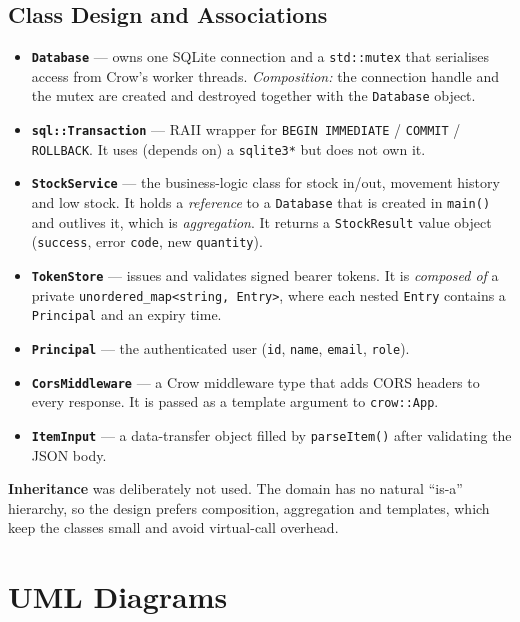 \documentclass[12pt,a4paper,oneside]{book}
\begin{document}
\subsection{Class Design and Associations}
\label{sec:assoc}
\begin{itemize}
  \item \textbf{\texttt{Database}} --- owns one SQLite connection and a \texttt{std::mutex} that
    serialises access from Crow's worker threads. \emph{Composition:} the connection handle and
    the mutex are created and destroyed together with the \texttt{Database} object.
  \item \textbf{\texttt{sql::Transaction}} --- RAII wrapper for \texttt{BEGIN IMMEDIATE} /
    \texttt{COMMIT} / \texttt{ROLLBACK}. It uses (depends on) a \texttt{sqlite3*} but does not own it.
  \item \textbf{\texttt{StockService}} --- the business-logic class for stock in/out, movement
    history and low stock. It holds a \emph{reference} to a \texttt{Database} that is created in
    \texttt{main()} and outlives it, which is \emph{aggregation}. It returns a
    \texttt{StockResult} value object (\texttt{success}, error \texttt{code}, new \texttt{quantity}).
  \item \textbf{\texttt{TokenStore}} --- issues and validates signed bearer tokens. It is
    \emph{composed of} a private \texttt{unordered\_map<string, Entry>}, where each nested
    \texttt{Entry} contains a \texttt{Principal} and an expiry time.
  \item \textbf{\texttt{Principal}} --- the authenticated user (\texttt{id}, \texttt{name},
    \texttt{email}, \texttt{role}).
  \item \textbf{\texttt{CorsMiddleware}} --- a Crow middleware type that adds CORS headers to
    every response. It is passed as a template argument to \texttt{crow::App}.
  \item \textbf{\texttt{ItemInput}} --- a data-transfer object filled by \texttt{parseItem()} after
    validating the JSON body.
\end{itemize}

\noindent\textbf{Inheritance} was deliberately not used. The domain has no natural
``is-a'' hierarchy, so the design prefers composition, aggregation and templates, which keep
the classes small and avoid virtual-call overhead.

\section{UML Diagrams}
\end{document}
